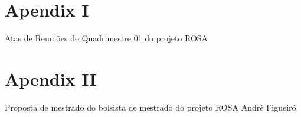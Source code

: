 \newpage
\appendix
\section{Apendix I} \label{App:AppendixA} 

Atas de Reuniões do Quadrimestre 01 do projeto ROSA


































\newpage
\appendix
\section{Apendix II} \label{App:AppendixA} 

Proposta de mestrado do bolsista de mestrado do projeto ROSA André Figueiró 


